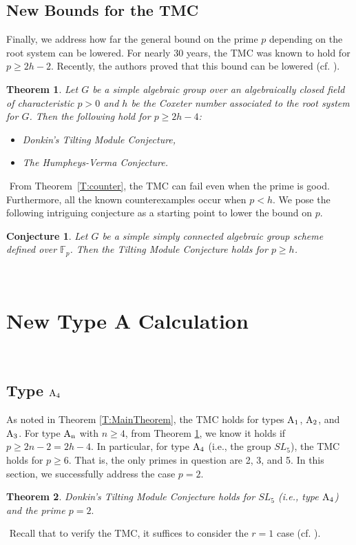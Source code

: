 \documentclass[twoside,11pt,reqno]{amsart}
\newcommand{\0}{\bar 0}
\newcommand{\1}{\bar 1}
\newtheorem{theorem}{Theorem}[subsection]
\newtheorem{conj}{Conjecture}[subsection]
\theoremstyle{definition}
\numberwithin{equation}{subsection}
\begin{document}
\subsection{New Bounds for the TMC} Finally, we address how far the general bound on the prime $p$ depending on the root system can be lowered. For nearly 30 years, the TMC was known to hold for $p\geq 2h-2$. Recently, the authors proved that this 
bound can be lowered (cf. \cite[Theorem 1.2.1]{BNPS24}). 
﻿
\begin{theorem}\label{T:2h-4} Let $G$ be a simple algebraic group over an algebraically closed field of characteristic $p>0$ and $h$ be the Coxeter number associated to the root system for $G$. Then the following hold for $p\geq 2h-4$: 
\begin{itemize} 
\item[(a)]  Donkin's Tilting Module Conjecture, 
\item[(b)]  The Humpheys-Verma Conjecture.
\end{itemize} 
\end{theorem} 
﻿
From Theorem~\ref{T:counter}, the TMC can fail even when the prime is good. Furthermore, all the known counterexamples occur when $p<h$. We pose the following intriguing conjecture as a starting point to lower the bound on $p$. 
﻿
\begin{conj} Let $G$ be a simple simply connected algebraic group scheme defined over ${\mathbb F}_{p}$. Then 
the Tilting Module Conjecture holds for $p\geq h$. 
\end{conj} 
﻿
﻿
﻿
﻿
\section{New Type A Calculation} \label{S:newcase}
﻿
\subsection{Type $\rm{A}_4$} As noted in Theorem \ref{T:MainTheorem}, the TMC holds for types $\rm{A}_1$, $\rm{A}_2$, and $\rm{A}_3$. For type $\rm{A}_n$ with $n\geq 4$, from Theorem \ref{T:2h-4}, we know it holds if $p \geq 2n - 2=2h-4$.  In particular, for type $\rm{A}_4$ (i.e., the group $SL_5$), the TMC holds for $p \geq 6$.  That is, the only primes in question are 2, 3, and 5.    In this section, we successfully address the case $p = 2$.  
﻿
\begin{theorem}\label{T:A4} Donkin's Tilting Module Conjecture holds for $SL_5$ (i.e., type $\rm{A}_4$) and the prime $p=2.$
\end{theorem}
﻿
Recall that to verify the TMC, it suffices to consider the $r = 1$ case (cf. \cite[Proposition 2.2.2]{BNPS22a}). 
﻿
﻿
\end{document}
